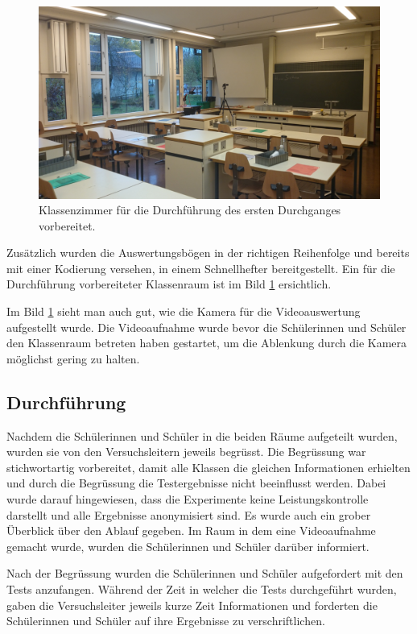 \begin{figure}[htb]
\centering
\includegraphics[width=0.7\linewidth]{graphics/Durchfuerhung}
\caption[Vorbereitetes Klassenzimmer.]{Klassenzimmer für die Durchführung des ersten Durchganges vorbereitet.}
\label{fig:Durchfuerhung}
\end{figure}

Zusätzlich wurden die Auswertungsbögen in der richtigen Reihenfolge und bereits mit einer Kodierung versehen, in einem Schnellhefter bereitgestellt. Ein für die Durchführung vorbereiteter Klassenraum ist im Bild \ref{fig:Durchfuerhung} ersichtlich.

Im Bild \ref{fig:Durchfuerhung} sieht man auch gut, wie die Kamera für die Videoauswertung aufgestellt wurde. Die Videoaufnahme wurde bevor die Schülerinnen und Schüler den Klassenraum betreten haben gestartet, um die Ablenkung durch die Kamera möglichst gering zu halten.

\subsection{Durchführung}
Nachdem die Schülerinnen und Schüler in die beiden Räume aufgeteilt wurden, wurden sie von den Versuchsleitern jeweils begrüsst. Die Begrüssung war stichwortartig vorbereitet, damit alle Klassen die gleichen Informationen erhielten und durch die Begrüssung die Testergebnisse nicht beeinflusst werden. Dabei wurde darauf hingewiesen, dass die Experimente keine Leistungskontrolle darstellt und alle Ergebnisse anonymisiert sind. Es wurde auch ein grober Überblick über den Ablauf gegeben. Im Raum in dem eine Videoaufnahme gemacht wurde, wurden die Schülerinnen und Schüler darüber informiert. 

Nach der Begrüssung wurden die Schülerinnen und Schüler aufgefordert mit den Tests anzufangen. Während der Zeit in welcher die Tests durchgeführt wurden, gaben die Versuchsleiter jeweils kurze Zeit Informationen und forderten die Schülerinnen und Schüler auf ihre Ergebnisse zu verschriftlichen.

